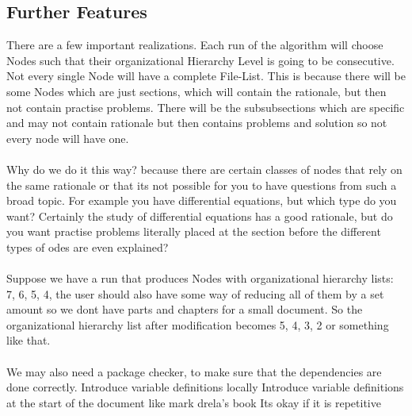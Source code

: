 \documentclass[a4paper, 12pt]{report}
\begin{document}
\begin{center}
\subsection{Further Features}
\begin{comment}
\end{comment}
There are a few important realizations. Each run of the algorithm will choose Nodes such that their organizational Hierarchy Level is going to be consecutive. 
Not every single Node will have a complete File-List. This is because there will be some Nodes which are just sections, which will contain the rationale, but then not contain practise problems.
There will be the subsubsections which are specific and may not contain rationale but then contains problems and solution so not every node will have one.
\\~\\Why do we do it this way? because there are certain classes of nodes that rely on the same rationale or that its not possible for you to have questions from such a broad topic. For example you have differential equations, but which type do you want? Certainly the study of differential equations has a good rationale, but do you want practise problems literally placed at the section before the different types of odes are even explained?
\\~\\Suppose we have a run that produces Nodes with organizational hierarchy lists: 7, 6, 5, 4, the user should also have some way of reducing all of them by a set amount so we dont have parts and chapters for a small document. So the organizational hierarchy list after modification becomes 5, 4, 3, 2 or something like that.
\\~\\We may also need a package checker, to make sure that the dependencies are done correctly.
Introduce variable definitions locally
Introduce variable definitions at the start of the document like mark drela's book
Its okay if it is repetitive


\end{center}
\end{document}
